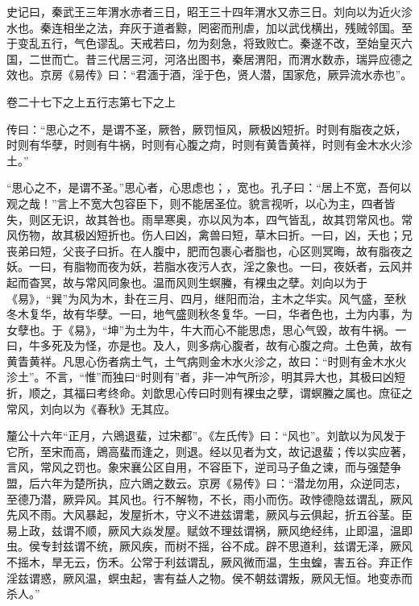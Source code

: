 \documentclass[12pt,UTF8]{ctexbook}
\begin{document}
史记曰，秦武王三年渭水赤者三日，昭王三十四年渭水又赤三日。刘向以为近火沴水也。秦连相坐之法，弃灰于道者黥，罔密而刑虐，加以武伐横出，残贼邻国。至于变乱五行，气色谬乱。天戒若曰，勿为刻急，将致败亡。秦遂不改，至始皇灭六国，二世而亡。昔三代居三河，河洛出图书，秦居渭阳，而渭水数赤，瑞异应德之效也。京房《易传》曰：“君湎于酒，淫于色，贤人潜，国家危，厥异流水赤也”。





卷二十七下之上五行志第七下之上



传曰：“思心之不，是谓不圣，厥咎，厥罚恒风，厥极凶短折。时则有脂夜之妖，时则有华孽，时则有牛祸，时则有心腹之疴，时则有黄眚黄祥，时则有金木水火沴土。”



“思心之不，是谓不圣。”思心者，心思虑也；，宽也。孔子曰：“居上不宽，吾何以观之哉！”言上不宽大包容臣下，则不能居圣位。貌言视听，以心为主，四者皆失，则区无识，故其咎也。雨旱寒奥，亦以风为本，四气皆乱，故其罚常风也。常风伤物，故其极凶短折也。伤人曰凶，禽兽曰短，草木曰折。一曰，凶，夭也；兄丧弟曰短，父丧子曰折。在人腹中，肥而包裹心者脂也，心区则冥晦，故有脂夜之妖。一曰，有脂物而夜为妖，若脂水夜污人衣，淫之象也。一曰，夜妖者，云风并起而杳冥，故与常风同象也。温而风则生螟螣，有裸虫之孽。刘向以为于《易》，“巽”为风为木，卦在三月、四月，继阳而治，主木之华实。风气盛，至秋冬木复华，故有华孽。一曰，地气盛则秋冬复华。一曰，华者色也，土为内事，为女孽也。于《易》，“坤”为土为牛，牛大而心不能思虑，思心气毁，故有牛祸。一曰，牛多死及为怪，亦是也。及人，则多病心腹者，故有心腹之疴。土色黄，故有黄眚黄祥。凡思心伤者病土气，土气病则金木水火沴之，故曰：“时则有金木水火沴土”。不言，“惟”而独曰“时则有”者，非一冲气所沴，明其异大也，其极曰凶短折，顺之，其福曰考终命。刘歆思心传曰时则有裸虫之孽，谓螟螣之属也。庶征之常风，刘向以为《春秋》无其应。



釐公十六年“正月，六鶂退蜚，过宋都”。《左氏传》曰：“风也”。刘歆以为风发于它所，至宋而高，鶂高蜚而逢之，则退。经以见者为文，故记退蜚；传以实应著，言风，常风之罚也。象宋襄公区自用，不容臣下，逆司马子鱼之谏，而与强楚争盟，后六年为楚所执，应六鶂之数云。京房《易传》曰：“潜龙勿用，众逆同志，至德乃潜，厥异风。其风也。行不解物，不长，雨小而伤。政悖德隐兹谓乱，厥风先风不雨。大风暴起，发屋折木，守义不进兹谓耄，厥风与云俱起，折五谷茎。臣易上政，兹谓不顺，厥风大焱发屋。赋敛不理兹谓祸，厥风绝经纬，止即温，温即虫。侯专封兹谓不统，厥风疾，而树不摇，谷不成。辟不思道利，兹谓无泽，厥风不摇木，旱无云，伤禾。公常于利兹谓乱，厥风微而温，生虫蝗，害五谷。弃正作淫兹谓惑，厥风温，螟虫起，害有益人之物。侯不朝兹谓叛，厥风无恒。地变赤而杀人。”
\end{document}
